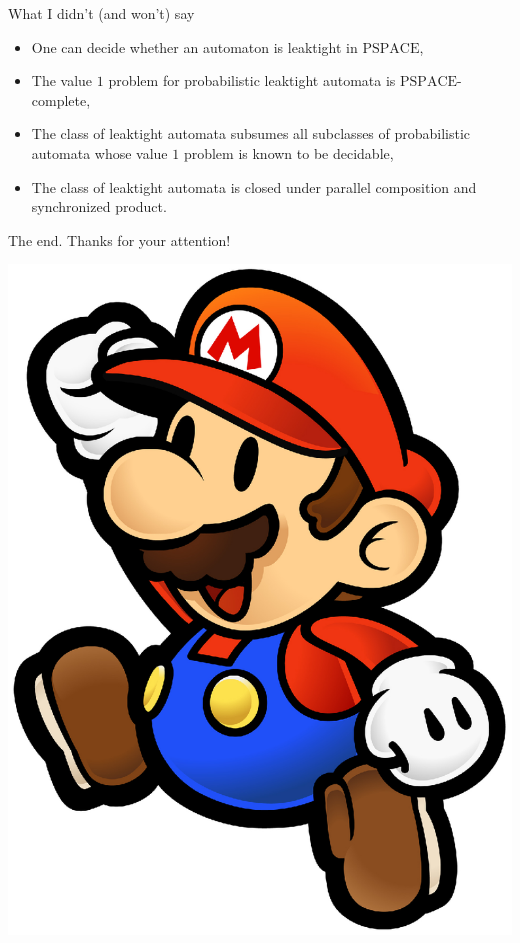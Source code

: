 \documentclass[svgnames]{beamer}
\newcommand{\PSPACE}{\mathrm{PSPACE}}
\begin{document}
\begin{frame}{What I didn't (and won't) say}
\begin{itemize}
	\item One can decide whether an automaton is leaktight in $\PSPACE$,
	\item The value $1$ problem for probabilistic leaktight automata is $\PSPACE$-complete,
	\item The class of leaktight automata subsumes all subclasses of probabilistic automata
whose value $1$ problem is known to be decidable,
	\item The class of leaktight automata is closed under parallel composition and synchronized product.
\end{itemize}
\end{frame}

\begin{frame}{The end.}
Thanks for your attention!

\begin{center}
\includegraphics[scale=0.2]{mario.eps}
\end{center}
\end{frame}
\end{document}
